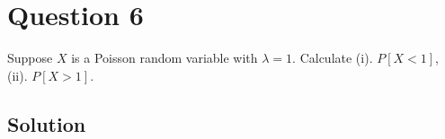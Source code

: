 \section*{Question 6}

Suppose \( X \) is a Poisson random variable with \( \lambda=1 \).
Calculate
(i). \( P[X<1] \),
(ii). \( P[X>1] \).

\subsection*{Solution}
